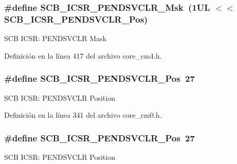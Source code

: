 \subsubsection[{\texorpdfstring{S\+C\+B\+\_\+\+I\+C\+S\+R\+\_\+\+P\+E\+N\+D\+S\+V\+C\+L\+R\+\_\+\+Msk}{SCB_ICSR_PENDSVCLR_Msk}}]{\setlength{\rightskip}{0pt plus 5cm}\#define S\+C\+B\+\_\+\+I\+C\+S\+R\+\_\+\+P\+E\+N\+D\+S\+V\+C\+L\+R\+\_\+\+Msk~(1\+U\+L $<$$<$ S\+C\+B\+\_\+\+I\+C\+S\+R\+\_\+\+P\+E\+N\+D\+S\+V\+C\+L\+R\+\_\+\+Pos)}\hypertarget{group___c_m_s_i_s___s_c_b_ga4a901ace381d3c1c74ac82b22fae2e1e}{}\label{group___c_m_s_i_s___s_c_b_ga4a901ace381d3c1c74ac82b22fae2e1e}
S\+CB I\+C\+SR\+: P\+E\+N\+D\+S\+V\+C\+LR Mask 

Definición en la línea 417 del archivo core\+\_\+cm4.\+h.

\subsubsection[{\texorpdfstring{S\+C\+B\+\_\+\+I\+C\+S\+R\+\_\+\+P\+E\+N\+D\+S\+V\+C\+L\+R\+\_\+\+Pos}{SCB_ICSR_PENDSVCLR_Pos}}]{\setlength{\rightskip}{0pt plus 5cm}\#define S\+C\+B\+\_\+\+I\+C\+S\+R\+\_\+\+P\+E\+N\+D\+S\+V\+C\+L\+R\+\_\+\+Pos~27}\hypertarget{group___c_m_s_i_s___s_c_b_gae218d9022288f89faf57187c4d542ecd}{}\label{group___c_m_s_i_s___s_c_b_gae218d9022288f89faf57187c4d542ecd}
S\+CB I\+C\+SR\+: P\+E\+N\+D\+S\+V\+C\+LR Position 

Definición en la línea 341 del archivo core\+\_\+cm0.\+h.

\subsubsection[{\texorpdfstring{S\+C\+B\+\_\+\+I\+C\+S\+R\+\_\+\+P\+E\+N\+D\+S\+V\+C\+L\+R\+\_\+\+Pos}{SCB_ICSR_PENDSVCLR_Pos}}]{\setlength{\rightskip}{0pt plus 5cm}\#define S\+C\+B\+\_\+\+I\+C\+S\+R\+\_\+\+P\+E\+N\+D\+S\+V\+C\+L\+R\+\_\+\+Pos~27}\hypertarget{group___c_m_s_i_s___s_c_b_gae218d9022288f89faf57187c4d542ecd}{}\label{group___c_m_s_i_s___s_c_b_gae218d9022288f89faf57187c4d542ecd}
S\+CB I\+C\+SR\+: P\+E\+N\+D\+S\+V\+C\+LR Position 

